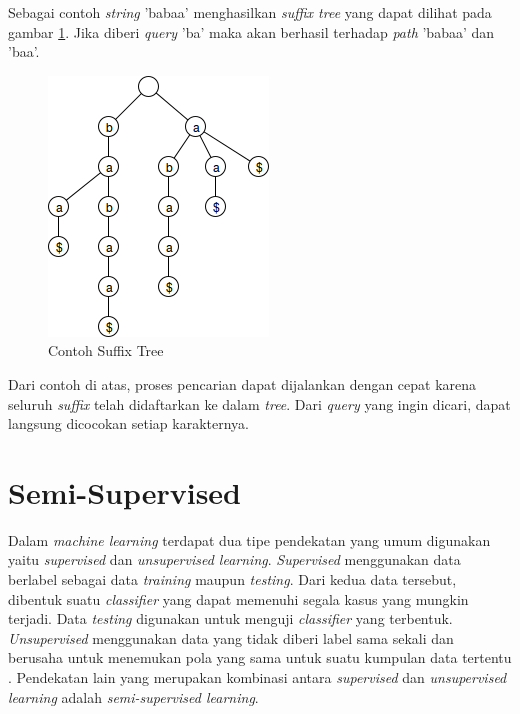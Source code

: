 Sebagai contoh \textit{string} 'babaa' menghasilkan \textit{suffix tree} yang dapat dilihat pada gambar \ref{fig:contoh-suffix-tree}. Jika diberi \textit{query} 'ba' maka akan berhasil terhadap \textit{path} 'babaa' dan 'baa'.
\begin{figure}
    \centering
    \includegraphics[scale=0.6]{pics/Contoh-SuffixTree}
    \caption{Contoh Suffix Tree}
    \label{fig:contoh-suffix-tree}
\end{figure}

\noindent Dari contoh di atas, proses pencarian dapat dijalankan dengan cepat karena seluruh \textit{suffix} telah didaftarkan ke dalam \textit{tree}. Dari \textit{query} yang ingin dicari, dapat langsung dicocokan setiap karakternya.

%
\section{Semi-Supervised}
Dalam \textit{machine learning} terdapat dua tipe pendekatan yang umum digunakan yaitu \textit{supervised} dan \textit{unsupervised learning}. \textit{Supervised} menggunakan data berlabel sebagai data \textit{training} maupun \textit{testing}. Dari kedua data tersebut, dibentuk suatu \textit{classifier} yang dapat memenuhi segala kasus yang mungkin terjadi. Data \textit{testing} digunakan untuk menguji \textit{classifier} yang terbentuk. \textit{Unsupervised} menggunakan data yang tidak diberi label sama sekali dan berusaha untuk menemukan pola yang sama untuk suatu kumpulan data tertentu \citep{prakash2014survey}. Pendekatan lain yang merupakan kombinasi antara \textit{supervised} dan \textit{unsupervised learning} adalah \textit{semi-supervised learning}. 

